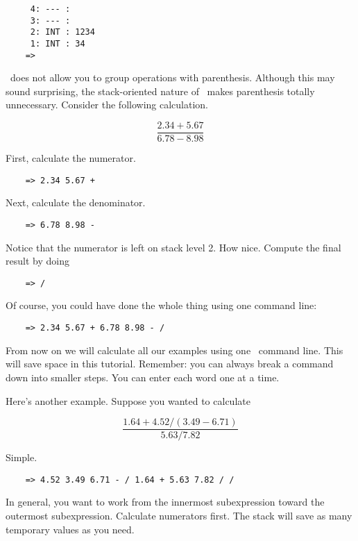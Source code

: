 \begin{verbatim}
     4: --- : 
     3: --- : 
     2: INT : 1234
     1: INT : 34
    => 
\end{verbatim}

\CLAC\ does not allow you to group operations with parenthesis. Although this may sound
surprising, the stack-oriented nature of \CLAC\ makes parenthesis totally unnecessary. Consider
the following calculation.

\begin{displaymath}
     \frac{ 2.34 + 5.67 }{ 6.78 - 8.98 }
\end{displaymath}

First, calculate the numerator.

\begin{verbatim}
    => 2.34 5.67 +
\end{verbatim}

Next, calculate the denominator.

\begin{verbatim}
    => 6.78 8.98 -
\end{verbatim}

Notice that the numerator is left on stack level 2. How nice. Compute the final result by doing

\begin{verbatim}
    => /
\end{verbatim}

Of course, you could have done the whole thing using one command line:

\begin{verbatim}
    => 2.34 5.67 + 6.78 8.98 - /
\end{verbatim}

From now on we will calculate all our examples using one \CLAC\ command line. This will save
space in this tutorial. Remember: you can always break a command down into smaller steps. You
can enter each word one at a time.

Here's another example. Suppose you wanted to calculate

\begin{displaymath}
     \frac { 1.64 + 4.52/(3.49 - 6.71) }{ 5.63 / 7.82 }
\end{displaymath}

Simple.

\begin{verbatim}
    => 4.52 3.49 6.71 - / 1.64 + 5.63 7.82 / /
\end{verbatim}

In general, you want to work from the innermost subexpression toward the outermost
subexpression. Calculate numerators first. The stack will save as many temporary values as you
need.

